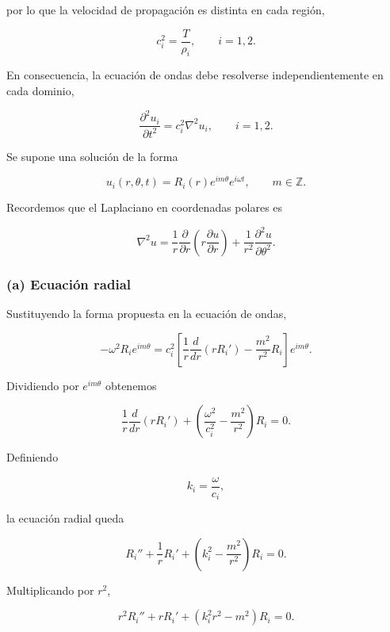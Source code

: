 \documentclass[12pt]{article}
\begin{document}
por lo que la velocidad de propagación es distinta en cada región,

\[
c_i^2=\frac{T}{\rho_i},
\qquad
i=1,2.
\]

En consecuencia, la ecuación de ondas debe resolverse independientemente en cada dominio,

\begin{equation}
\frac{\partial^2u_i}{\partial t^2}
=
c_i^2\nabla^2u_i,
\qquad
i=1,2.
\end{equation}

Se supone una solución de la forma

\begin{equation}
u_i(r,\theta,t)
=
R_i(r)e^{im\theta}e^{i\omega t},
\qquad
m\in\mathbb Z.
\end{equation}

Recordemos que el Laplaciano en coordenadas polares es

\begin{equation}
\nabla^2u
=
\frac1r
\frac{\partial}{\partial r}
\left(
r\frac{\partial u}{\partial r}
\right)
+
\frac1{r^2}
\frac{\partial^2u}{\partial\theta^2}.
\end{equation}

\subsubsection*{(a) Ecuación radial}

Sustituyendo la forma propuesta en la ecuación de ondas,

\[
-\omega^2R_ie^{im\theta}
=
c_i^2
\left[
\frac1r
\frac{d}{dr}
\left(
rR_i'
\right)
-
\frac{m^2}{r^2}R_i
\right]
e^{im\theta}.
\]

Dividiendo por $e^{im\theta}$ obtenemos

\[
\frac1r
\frac{d}{dr}
\left(
rR_i'
\right)
+
\left(
\frac{\omega^2}{c_i^2}
-
\frac{m^2}{r^2}
\right)
R_i
=0.
\]

Definiendo

\[
k_i=\frac{\omega}{c_i},
\]

la ecuación radial queda

\begin{equation}
R_i''
+\frac1rR_i'
+
\left(
k_i^2-\frac{m^2}{r^2}
\right)
R_i=0.
\end{equation}

Multiplicando por $r^2$,

\begin{equation}
\boxed{
r^2R_i''
+rR_i'
+
(k_i^2r^2-m^2)R_i=0.
}
\end{equation}
\end{document}
